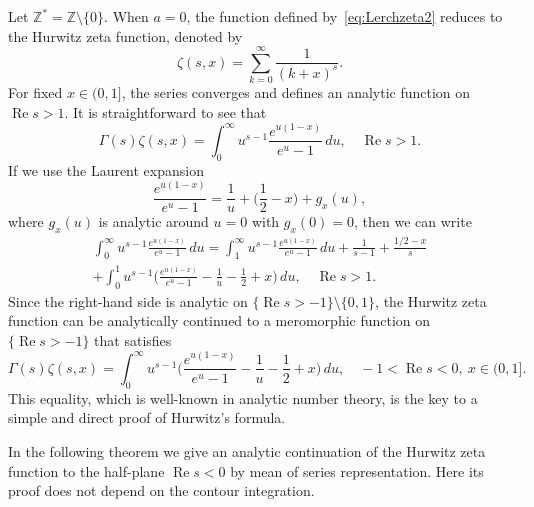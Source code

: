 \documentclass[11pt,a4paper,reqno]{amsart}
\newcommand{\C}{\mathbb{C}}
\newcommand{\Z}{\mathbb{Z}}
\renewcommand{\Re}{\operatorname{Re}}
\theoremstyle{plain}
\theoremstyle{remark}
\numberwithin{equation}{section}
\begin{document}
Let $\Z^* = \Z\setminus\{0\}$. When $a=0$, the function defined by~\eqref{eq:Lerchzeta2} reduces to the Hurwitz zeta function, denoted by
\begin{equation*}
  \zeta(s,x) = \sum_{k=0}^\infty\frac{1}{(k+x)^s}.
\end{equation*}
For fixed $x\in (0,1]$, the series converges and defines an analytic function on $\Re s>1$. It is straightforward to see that
\begin{equation*}
  \Gamma(s)\zeta(s,x) = \int_0^\infty u^{s-1} \frac{e^{u(1-x)}}{e^u-1} \,du,
  \quad \Re s>1.
\end{equation*}
If we use the Laurent expansion
\begin{equation}
\label{eq:Laurent}
  \frac{e^{u(1-x)}}{e^u-1} = \frac{1}{u} + \biggl(\frac12 -x\biggr) + g_x(u),
\end{equation}
where $g_x(u)$ is analytic around $u=0$ with $g_x(0)=0$, then we can write
\begin{multline*}
  \int_0^\infty u^{s-1}\frac{e^{u(1-x)}}{e^u-1} \,du
  = \int_1^\infty u^{s-1}\frac{e^{u(1-x)}}{e^u-1}\,du + \frac{1}{s-1}+\frac{1/2-x}{s}
  \\
  + \int_0^1 u^{s-1} \biggl(\frac{e^{u(1-x)}}{e^u-1}-\frac{1}{u}-\frac{1}{2}+x\biggr)\,du,
  \quad \Re s >1.
\end{multline*}
Since the right-hand side is analytic on $\{\Re s>-1\}\setminus\{0,1\}$, the Hurwitz zeta function can be analytically continued to a meromorphic function on $\{\Re s > -1\}$ that satisfies
\begin{equation}
\label{eq:paso3}
  \Gamma(s)\zeta(s,x) = \int_0^\infty u^{s-1} 
    \biggl(\frac{e^{u(1-x)}}{e^u-1}-\frac{1}{u}-\frac{1}{2}+x\biggr) \,du,
  \quad -1<\Re s<0,\ x\in (0,1].
\end{equation}
This equality, which is well-known in analytic number theory, is the key to a simple and direct proof of Hurwitz's formula.


In the following theorem we give an analytic continuation of the Hurwitz zeta function to the half-plane $\Re s < 0$ by mean of series representation. Here its proof does not depend on the contour integration.
\end{document}
